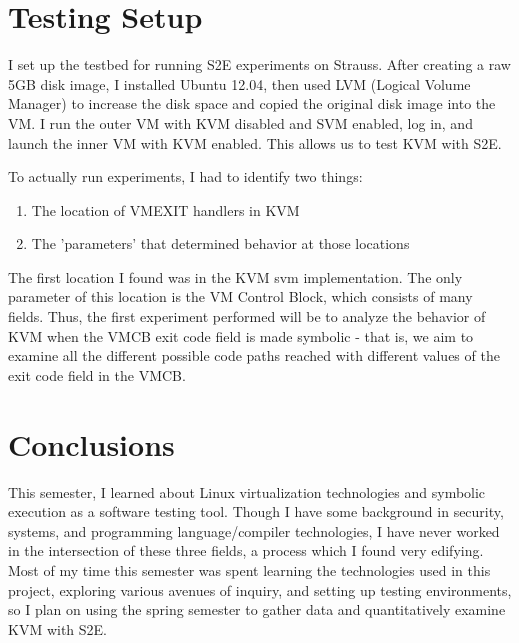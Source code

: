 \documentclass[11pt]{article}
\begin{document}
\section{Testing Setup}
I set up the testbed for running S2E experiments on Strauss. After creating a
raw 5GB disk image, I installed Ubuntu 12.04, then used LVM (Logical Volume
Manager) to increase the disk space and copied the original disk image into the
VM. I run the outer VM with KVM disabled and SVM enabled, log in, and launch the
inner VM with KVM enabled. This allows us to test KVM with S2E. \par

To actually run experiments, I had to identify two things:
\begin{enumerate}
\item The location of VMEXIT handlers in KVM
\item The 'parameters' that determined behavior at those locations
\end{enumerate}

The first location I found was in the KVM svm implementation. The only parameter
of this location is the VM Control Block, which consists of many fields. Thus,
the first experiment performed will be to analyze the behavior of KVM when the
VMCB exit code field is made symbolic - that is, we aim to examine all the
different possible code paths reached with different values of the exit code
field in the VMCB. 

\section{Conclusions}
This semester, I learned about Linux virtualization technologies and symbolic
execution as a software testing tool. Though I have some background in security,
systems, and programming language/compiler technologies, I have never worked in
the intersection of these three fields, a process which I found very
edifying. Most of my time this semester was spent learning the
technologies used in this project, exploring various avenues of inquiry, and
setting up testing environments, so I plan on using the spring semester to
gather data and quantitatively examine KVM with S2E.

 
\end{document}
